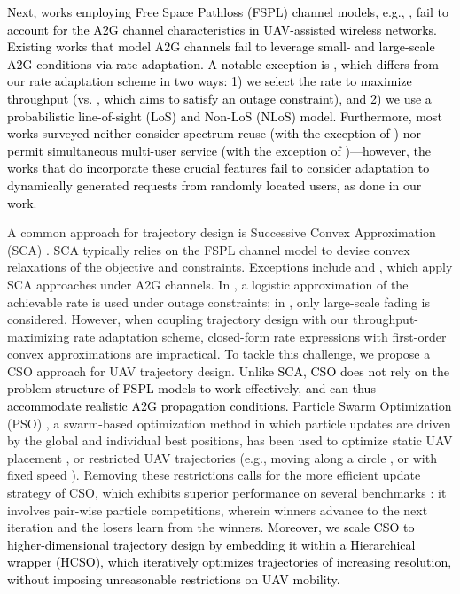 \documentclass[10pt, twocolumn]{IEEEtran}
\theoremstyle{plain}
\theoremstyle{definition}
\theoremstyle{remark}
\newcommand\hlt[1]{\textcolor{black}{#1}}
\begin{document}
\hlt{Next, works employing Free Space Pathloss (FSPL) channel models, e.g., \cite{SCA, PAoI, MEC-CVX, MEC-DDPG}, fail to account for the A2G channel characteristics in UAV-assisted wireless networks. 
Existing works that model A2G channels fail to leverage small- and large-scale A2G conditions via rate adaptation. A notable exception is \cite{Rician}, which differs from our rate adaptation scheme in two ways: 1) we select the rate to maximize throughput (vs. \cite{Rician}, which aims to satisfy an outage constraint), and 2) we use a probabilistic line-of-sight (LoS) and Non-LoS (NLoS) model. Furthermore, most works surveyed neither consider spectrum reuse (with the exception of \cite{CSCA-ADMM}) nor permit simultaneous multi-user service (with the exception of \cite{CSCA-ADMM, DDQN, MEC-DDPG})---however, the works that do incorporate these crucial features \cite{CSCA-ADMM, DDQN, MEC-DDPG} fail to consider adaptation to dynamically generated requests from randomly located users, as done in our work.}

A common approach for trajectory design is Successive Convex Approximation (SCA) \cite{SCA, Rician}. SCA typically relies on the FSPL channel model to devise convex relaxations of the objective and constraints. Exceptions include \cite{Rician} and \cite{CSCA-ADMM}, which apply SCA approaches under A2G channels. In \cite{Rician}, a logistic approximation of the achievable rate is used under outage constraints; in \cite{CSCA-ADMM}, only large-scale fading is considered. However, when coupling trajectory design with our throughput-maximizing rate adaptation scheme, closed-form rate expressions with first-order convex approximations are impractical. To tackle this challenge, we propose a CSO \cite{CSO} approach for UAV trajectory design. \hlt{Unlike SCA, CSO does not rely on the problem structure of FSPL models to work effectively, and can thus accommodate realistic A2G propagation conditions.} Particle Swarm Optimization (PSO) \cite{PSO}, a swarm-based optimization method in which particle updates are driven by the global and individual best positions, has been used to optimize static UAV placement \cite{Efficient3DPlacementPSO, 3DDeploymentPSO}, or restricted UAV trajectories (e.g., moving along a circle \cite{PSOPathStructure}, or with fixed speed \cite{PAoI}). Removing these restrictions calls for the more efficient update strategy of CSO, which exhibits superior performance on several benchmarks \cite{CSO}: it involves pair-wise particle competitions, wherein winners advance to the next iteration and the losers learn from the winners. \hlt{Moreover, we scale CSO to higher-dimensional trajectory design by embedding it within a Hierarchical wrapper (HCSO), which iteratively optimizes trajectories of increasing resolution, without imposing unreasonable restrictions on UAV mobility.}
\end{document}

